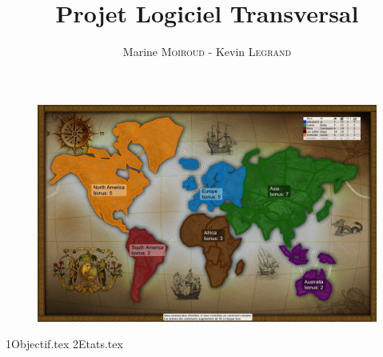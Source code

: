\documentclass[12pt]{article}
\title{\textbf{\huge Projet Logiciel Transversal}}
\author{Marine \textsc{Moiroud} - Kevin \textsc{Legrand}}
\newcommand*{\sourcedir}{Sources/}
\begin{document}
    
    \maketitle 
     \begin{figure}[!htbp]
        \centering
        \includegraphics[width=15cm]{Images/risk.jpg}
    \end{figure}
    \newpage
    \newpage
    \tableofcontents
    \newpage
    
    {1Objectif.tex}
    \newpage
    {2Etats.tex}
    \newpage
    \newpage
    \newpage
    \newpage
    
\end{document}
